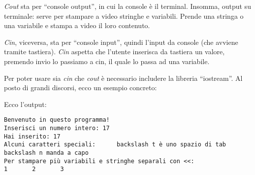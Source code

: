 	
	\emph{Cout} sta per ``console output'',  in cui la console è il terminal. Insomma, output su terminale: serve per stampare a video stringhe e variabili. Prende una stringa o una variabile e stampa a video il loro contenuto.
	
	\emph{Cin}, viceversa, sta per ``console input'', quindi l'input da console (che avviene tramite tastiera). \emph{Cin} aspetta che l'utente inserisca da tastiera un valore, premendo invio lo passiamo a cin, il quale lo passa ad una variabile.
	
	Per poter usare sia \emph{cin} che \emph{cout} è necessario includere la libreria ``iostream''.
	Al posto di grandi discorsi, ecco un esempio concreto:
	
	
	Ecco l'output:
	\begin{shaded}
\begin{verbatim}
Benvenuto in questo programma!                                                                                                                                          
Inserisci un numero intero: 17                                                                                                                                          
Hai inserito: 17                                                                                                                                                        
Alcuni caratteri speciali:      backslash t è uno spazio di tab                                                                                                         
backslash n manda a capo                                                                                                                                                
Per stampare più variabili e stringhe separali con <<:                                                                                                                  
1       2       3     
\end{verbatim}
	\end{shaded}

